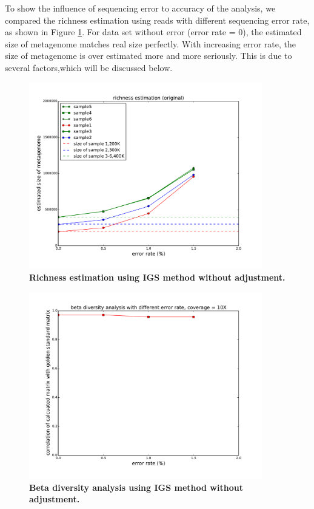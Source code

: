 To show the influence of sequencing error to accuracy of the 
analysis, we compared the richness estimation using reads with different 
sequencing error rate, as shown in Figure \ref{fig:IGS_richness_no_adjustment}. 
For data set without error (error rate = 0), the estimated size of metagenome
matches real size perfectly. With increasing error rate, the size of metagenome
is over estimated more and more seriously. This is due to several factors,which
will be discussed below. 
\begin{figure}[!ht]
 \centerline{\includegraphics[width=4in]{./figures/alpha_by_error_no_adjust.pdf}}
\caption{\bf Richness estimation using IGS method without adjustment.}
\label{fig:IGS_richness_no_adjustment}
\end{figure}

\begin{figure}[!ht]
 \centerline{\includegraphics[width=4in]{./figures/beta_by_error.pdf}}
\caption{\bf Beta diversity analysis using IGS method without adjustment.}
\label{fig:beta_no_adjustment}
\end{figure}

